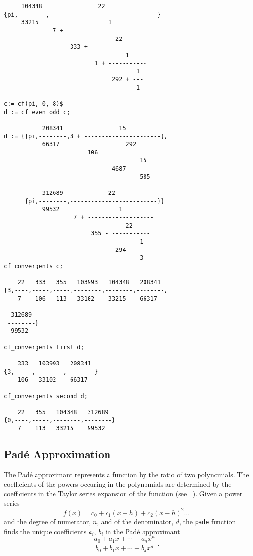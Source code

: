 \begin{verbatim}
     104348                22
{pi,--------,-------------------------------}
     33215                    1
              7 + -------------------------
                                22
                   333 + -----------------
                                   1
                          1 + -----------
                                      1
                               292 + ---
                                      1

c:= cf(pi, 0, 8)$
d := cf_even_odd c;

           208341                15
d := {{pi,--------,3 + ----------------------},
           66317                   292
                        106 - --------------
                                       15
                               4687 - -----
                                       585

           312689             22
      {pi,--------,-------------------------}}
           99532                 1
                    7 + -------------------
                                   22
                         355 - -----------
                                       1
                                294 - ---
                                       3
cf_convergents c;

    22   333   355   103993   104348   208341
{3,----,-----,-----,--------,--------,--------,
    7    106   113   33102    33215    66317

  312689
 --------}
  99532

cf_convergents first d;

    333   103993   208341
{3,-----,--------,--------}
    106   33102    66317

cf_convergents second d;

    22   355   104348   312689
{0,----,-----,--------,--------}
    7    113   33215    99532
\end{verbatim}

\subsection{Pad\'{e} Approximation}

The Pad\'{e} approximant represents a function by the ratio of two
polynomials. The coefficients of the powers occuring in the polynomials
are determined by the coefficients in the Taylor series
expansion of the function (see ~\cite{BakerGravesMorris:81}). Given a power series
\[ f(x) = c_0 + c_1 (x-h) + c_2 (x-h)^2 \ldots \]
and the degree of numerator, $n$, and of the denominator, $d$,
the \texttt{pade} function finds the unique coefficients
$a_i,\, b_i$ in the Pad\'{e} approximant
\[ \frac{a_0+a_1 x+ \cdots + a_n x^n}{b_0+b_1 x+ \cdots + b_d x^d} \; .\]

